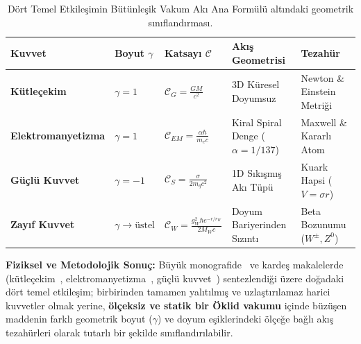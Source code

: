 \documentclass[11pt,a4paper]{article}
\begin{document}
\begin{table}[h!]
    \centering
    \footnotesize
    \begin{tabular}{@{}lllll@{}}
        \toprule
        \textbf{Kuvvet}            & \textbf{Boyut $\gamma$}   & \textbf{Katsayı $\mathcal{C}$}                           & \textbf{Akış Geometrisi}            & \textbf{Tezahür}             \\ \midrule
        \textbf{Kütleçekim}        & $\gamma = 1$              & $\mathcal{C}_G = \frac{GM}{c^2}$                         & 3D Küresel Doyumsuz                 & Newton \& Einstein Metriği   \\
        \textbf{Elektromanyetizma} & $\gamma = 1$              & $\mathcal{C}_{EM} = \frac{\alpha \hbar}{m_e c}$          & Kiral Spiral Denge ($\alpha=1/137$) & Maxwell \& Kararlı Atom      \\
        \textbf{Güçlü Kuvvet}      & $\gamma = -1$             & $\mathcal{C}_S = \frac{\sigma}{2 m_q c^2}$               & 1D Sıkışmış Akı Tüpü                & Kuark Hapsi ($V = \sigma r$) \\
        \textbf{Zayıf Kuvvet}      & $\gamma \to \text{üstel}$ & $\mathcal{C}_W = \frac{g_W^2 \hbar e^{-r/r_W}}{2 M_W c}$ & Doyum Bariyerinden Sızıntı          & Beta Bozunumu ($W^\pm, Z^0$) \\ \bottomrule
    \end{tabular}
    \caption{Dört Temel Etkileşimin Bütünleşik Vakum Akı Ana Formülü altındaki geometrik sınıflandırması.}
    \label{tab:dort_kuvvet_sentez}
\end{table}

\textbf{Fiziksel ve Metodolojik Sonuç:} Büyük monografide~\cite{main_paper} ve kardeş makalelerde (kütleçekim~\cite{paper4}, elektromanyetizma~\cite{paper5}, güçlü kuvvet~\cite{paper6}) sentezlendiği üzere doğadaki dört temel etkileşim; birbirinden tamamen yalıtılmış ve uzlaştırılamaz harici kuvvetler olmak yerine, \textbf{ölçeksiz ve statik bir Öklid vakumu} içinde büzüşen maddenin farklı geometrik boyut ($\gamma$) ve doyum eşiklerindeki ölçeğe bağlı akış tezahürleri olarak tutarlı bir şekilde sınıflandırılabilir.
\end{document}
